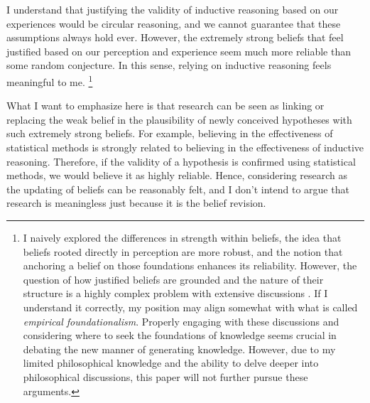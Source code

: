 \documentclass{book}
\begin{document}
I understand that justifying the validity of inductive reasoning based on our experiences would be circular reasoning, and we cannot guarantee that these assumptions always hold ever. However, the extremely strong beliefs that feel justified based on our perception and experience seem much more reliable than some random conjecture. In this sense, relying on inductive reasoning feels meaningful to me. \footnote{I naively explored the differences in strength within beliefs, the idea that beliefs rooted directly in perception are more robust, and the notion that anchoring a belief on those foundations enhances its reliability. However, the question of how justified beliefs are grounded and the nature of their structure is a highly complex problem with extensive discussions  \cite{sep-epistemology}. If I understand it correctly, my position may align somewhat with what is called \textit{empirical foundationalism}. Properly engaging with these discussions and considering where to seek the foundations of knowledge seems crucial in debating the new manner of generating knowledge. However, due to my limited philosophical knowledge and the ability to delve deeper into philosophical discussions, this paper will not further pursue these arguments.}


What I want to emphasize here is that research can be seen as linking or replacing the weak belief in the plausibility of newly conceived hypotheses with such extremely strong beliefs. For example, believing in the effectiveness of statistical methods is strongly related to believing in the effectiveness of inductive reasoning. Therefore, if the validity of a hypothesis is confirmed using statistical methods, we would believe it as highly reliable. Hence, considering research as the updating of beliefs can be reasonably felt, and I don't intend to argue that research is meaningless just because it is the belief revision. 
\end{document}
